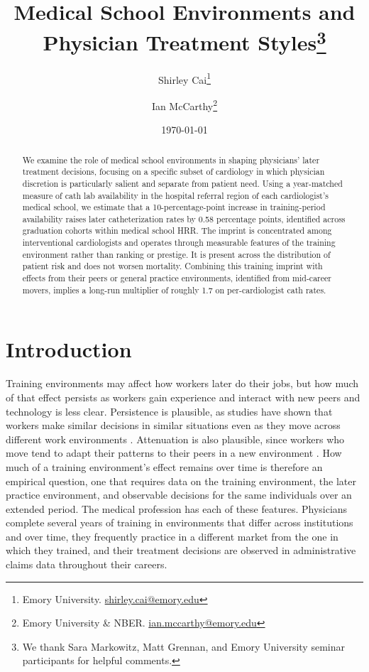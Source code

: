 \documentclass[12pt]{article}
\title{Medical School Environments and Physician Treatment Styles\thanks{We thank Sara Markowitz, Matt Grennan, and Emory University seminar participants for helpful comments.}}
\author{Shirley Cai\thanks{Emory University. \href{mailto:shirley.cai@emory.edu}{shirley.cai@emory.edu}} \and Ian McCarthy\thanks{Emory University \& NBER.
\href{mailto:ian.mccarthy@emory.edu}{ian.mccarthy@emory.edu}}}
\date{\today}
\begin{document}
\maketitle

\begin{abstract}
\noindent We examine the role of medical school environments in shaping physicians' later treatment decisions, focusing on a specific subset of cardiology in which physician discretion is particularly salient and separate from patient need. Using a year-matched measure of cath lab availability in the hospital referral region of each cardiologist's medical school, we estimate that a 10-percentage-point increase in training-period availability raises later catheterization rates by 0.58 percentage points, identified across graduation cohorts within medical school HRR. The imprint is concentrated among interventional cardiologists and operates through measurable features of the training environment rather than ranking or prestige. It is present across the distribution of patient risk and does not worsen mortality. Combining this training imprint with effects from their peers or general practice environments, identified from mid-career movers, implies a long-run multiplier of roughly 1.7 on per-cardiologist cath rates.
\end{abstract}

\clearpage

\section{Introduction}\label{sec:intro}

Training environments may affect how workers later do their jobs, but how much of that effect persists as workers gain experience and interact with new peers and technology is less clear. Persistence is plausible, as studies have shown that workers make similar decisions in similar situations even as they move across different work environments \citep{bertrand2003}. Attenuation is also plausible, since workers who move tend to adapt their patterns to their peers in a new environment \citep{molitor2018}. How much of a training environment's effect remains over time is therefore an empirical question, one that requires data on the training environment, the later practice environment, and observable decisions for the same individuals over an extended period. The medical profession has each of these features. Physicians complete several years of training in environments that differ across institutions and over time, they frequently practice in a different market from the one in which they trained, and their treatment decisions are observed in administrative claims data throughout their careers.
\end{document}
